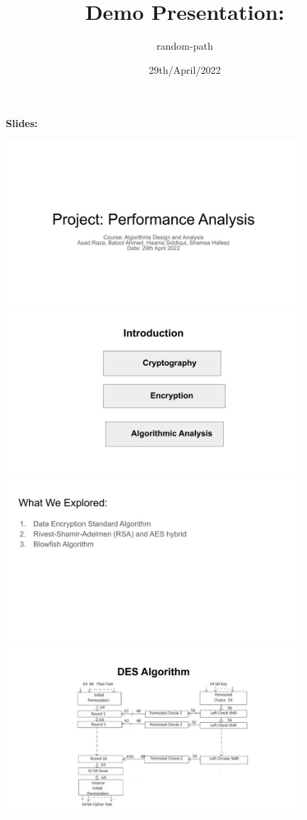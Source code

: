 \documentclass[a4paper]{beamer}
\title{Demo Presentation:}
\author{random-path}
\date{29th/April/2022}
\begin{document}
\maketitle
\textbf{Slides:}

\includegraphics[width=11cm]{images/Prez_1.jpg}
\includegraphics[width=11cm]{images/Prez_2.jpg}
\includegraphics[width=11cm]{images/Prez_3.jpg}
\includegraphics[width=11cm]{images/Prez_4.jpg}
\end{document}
